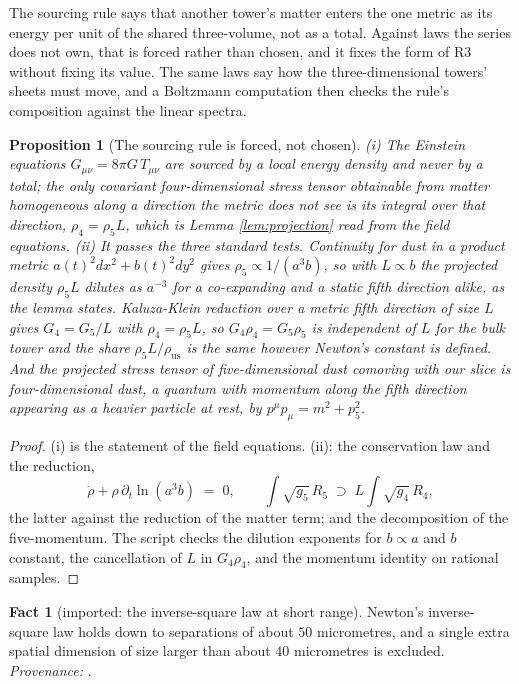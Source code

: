 \documentclass[11pt]{article}
\newtheorem{proposition}[theorem]{Proposition}
\theoremstyle{definition}
\newtheorem{fact}[theorem]{Fact}
\begin{document}
The sourcing rule says that another tower's matter enters the one metric as its energy per unit of the shared three-volume, not as a total. Against laws the series does not own, that is forced rather than chosen, and it fixes the form of R3 without fixing its value. The same laws say how the three-dimensional towers' sheets must move, and a Boltzmann computation then checks the rule's composition against the linear spectra.

\begin{proposition}[The sourcing rule is forced, not chosen]\label{prop:sourcing}
(i) The Einstein equations $G_{\mu\nu} = 8\pi G\,T_{\mu\nu}$ are sourced by a local energy density and never by a total; the only covariant four-dimensional stress tensor obtainable from matter homogeneous along a direction the metric does not see is its integral over that direction, $\rho_{4} = \rho_{5}L$, which is Lemma \ref{lem:projection} read from the field equations. (ii) It passes the three standard tests. Continuity for dust in a product metric $a(t)^{2}dx^{2} + b(t)^{2}dy^{2}$ gives $\rho_{5} \propto 1/(a^{3}b)$, so with $L \propto b$ the projected density $\rho_{5}L$ dilutes as $a^{-3}$ for a co-expanding and a static fifth direction alike, as the lemma states. Kaluza-Klein reduction over a metric fifth direction of size $L$ gives $G_{4} = G_{5}/L$ with $\rho_{4} = \rho_{5}L$, so $G_{4}\rho_{4} = G_{5}\rho_{5}$ is independent of $L$ for the bulk tower and the share $\rho_{5}L/\rho_{\mathrm{us}}$ is the same however Newton's constant is defined. And the projected stress tensor of five-dimensional dust comoving with our slice is four-dimensional dust, a quantum with momentum along the fifth direction appearing as a heavier particle at rest, by $p^{\mu}p_{\mu} = m^{2} + p_{5}^{2}$.
\end{proposition}

\begin{proof}
(i) is the statement of the field equations. (ii): the conservation law and the reduction,
\[
\dot\rho + \rho\,\partial_{t}\ln(a^{3}b) \;=\; 0, \qquad \int\sqrt{g_{5}}\,R_{5} \;\supset\; L\int\sqrt{g_{4}}\,R_{4},
\]
the latter against the reduction of the matter term; and the decomposition of the five-momentum. The script checks the dilution exponents for $b \propto a$ and $b$ constant, the cancellation of $L$ in $G_{4}\rho_{4}$, and the momentum identity on rational samples.
\end{proof}

\begin{fact}[imported: the inverse-square law at short range]\label{fact:cavendish}
Newton's inverse-square law holds down to separations of about $50$ micrometres, and a single extra spatial dimension of size larger than about $40$ micrometres is excluded. \emph{Provenance:} \cite{Lee2020}.
\end{fact}
\end{document}
